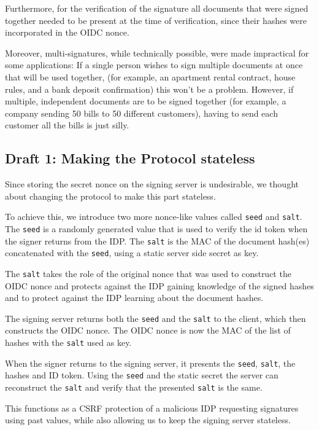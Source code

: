 Furthermore,
for the verification of the signature all documents that were signed together needed to be present at the time of verification,
since their hashes were incorporated in the \gls{OIDC} nonce.

Moreover, multi-signatures, while technically possible, were made impractical for some applications:
If a single person wishes to sign multiple documents at once that will be used together,
(for example, an apartment rental contract, house rules, and a bank deposit confirmation)
this won't be a problem.
However, if multiple, independent documents are to be signed together
(for example, a company sending 50 bills to 50 different customers),
having to send each customer all the bills is just silly.

\subsection{Draft 1: Making the Protocol stateless}\label{subsec:draft-1:-making-the-protocol-stateless}
Since storing the secret nonce on the signing server is undesirable,
we thought about changing the protocol to make this part stateless.

To achieve this, we introduce two more nonce-like values called \texttt{seed} and \texttt{salt}.
The \texttt{seed} is a randomly generated value that is used to verify the id token when the signer returns from the \gls{IDP}.
The \texttt{salt} is the \gls{MAC} of the document hash(es) concatenated with the \texttt{seed}, using a static server side secret as key.

The \texttt{salt} takes the role of the original nonce that was used to construct the \gls{OIDC} nonce and protects against the \gls{IDP} gaining knowledge of the signed hashes and to protect against the \gls{IDP} learning about the document hashes.

The signing server returns both the \texttt{seed} and the \texttt{salt} to the client,
which then constructs the \gls{OIDC} nonce.
The \gls{OIDC} nonce is now the \gls{MAC} of the list of hashes with the \texttt{salt} used as key.

When the signer returns to the signing server, it presents the \texttt{seed}, \texttt{salt}, the hashes and ID token.
Using the \texttt{seed} and the static secret the server can reconstruct the \texttt{salt} and verify that the presented \texttt{salt} is the same.

This functions as a \gls{CSRF} protection of a malicious \gls{IDP} requesting signatures using past values,
while also allowing us to keep the signing server stateless.

